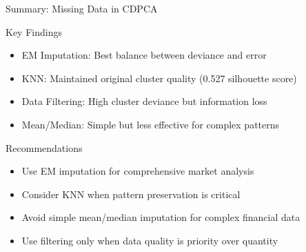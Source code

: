 \documentclass{beamer}
\begin{document}
\begin{frame}{Summary: Missing Data in CDPCA}
    \begin{block}{Key Findings}
        \begin{itemize}
        \item EM Imputation: Best balance between deviance and error
        \item KNN: Maintained original cluster quality (0.527 silhouette score)
        \item Data Filtering: High cluster deviance but information loss
        \item Mean/Median: Simple but less effective for complex patterns
        \end{itemize}
    \end{block}
    \begin{block}{Recommendations}
        \begin{itemize}
        \item Use EM imputation for comprehensive market analysis
        \item Consider KNN when pattern preservation is critical
        \item Avoid simple mean/median imputation for complex financial data
        \item Use filtering only when data quality is priority over quantity
        \end{itemize}
    \end{block}
\end{frame}
\end{document}
